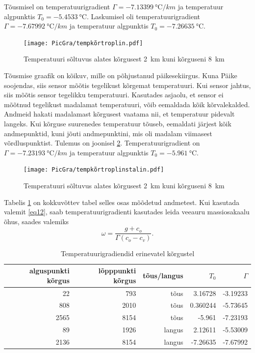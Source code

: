 \documentclass{trkut}%
\begin{document}
Tõusmisel on temperatuurigradient $\Gamma =\SI{-7.13399}{\degreeCelsius/km}$ ja temperatuur algpunktis $T_0 = \SI{-5.4533}{\celsius}$. Laskumisel oli temperatuurigradient $\Gamma =\SI{-7.67992}{\degreeCelsius/km}$ ja temperatuur algpunktis $T_0 = \SI{-7.26635}{\celsius}$.

\begin{figure}[h]
	\texttt{[image: PicGra/tempkõrtroplin.pdf]}
	\caption{Temperatuuri sõltuvus alates kõrgusest \SI{2}{km} kuni kõrguseni \SI{8}{km}}
	\label{tempkõrtroplin}%
\end{figure}

Tõusmise graafik on kõikuv, mille on põhjustanud päikesekiirgus. Kuna Päike soojendas, siis sensor mõõtis tegelikust kõrgemat temperatuuri. Kui sensor jahtus, siis mõõtis sensor tegelikku temperatuuri. Kasutades asjaolu, et sensor ei mõõtnud tegelikust madalamat temperatuuri, võib eemaldada kõik kõrvalekalded. Andmeid hakati madalamast kõrgusest vaatama nii, et temperatuur pidevalt langeks. Kui kõrguse suurenedes temperatuur tõuseb, eemaldati järjest kõik andmepunktid, kuni jõuti andmepunktini, mis oli madalam viimasest võrdluspunktist. Tulemus on joonisel \ref{tempkõrtroplinstalin}. Temperatuurigradient on $\Gamma =\SI{-7.23193}{\degreeCelsius/km}$ ja temperatuur algpunktis $T_0 = \SI{-5.961}{\celsius}$.

\begin{figure}[h]
	\texttt{[image: PicGra/tempkõrtroplinstalin.pdf]}
 	\caption{Temperatuuri sõltuvus alates kõrgusest \SI{2}{km} kuni kõrguseni \SI{8}{km}}
 	\label{tempkõrtroplinstalin}%
\end{figure}

Tabelis \ref{tabel1} on kokkuvõttev tabel selles osas mõõdetud andmetest. Kui kasutada valemit \ref{eq12}, saab temperatuurigradienti kasutades leida veeauru massiosakaalu õhus, saades valemiks
\begin{equation}
\omega = \frac{g + c_o}{\Gamma(c_o-c_v)}.
\end{equation}
\begin{table}[htb]
	\caption{Temperatuurigradiendid erinevatel kõrgustel}
	\label{tabel1}
	\begin{tabular}{r|r|r|r|r}
		\hline
		alguspunkti kõrgus & lõpppunkti kõrgus & tõus/langus & $T_0$ & $\Gamma$ \\
		\hline
		22 & 793 & tõus & 3.16728 & -3.19233 \\
		808 & 2010 & tõus & 0.360244 & -5.73645 \\
		2565 & 8154 & tõus & -5.961 & -7.23193 \\
		89 & 1926 & langus & 2.12611 & -5.53009 \\
		2136 & 8154 & langus & -7.26635 & -7.67992
	\end{tabular}
\end{table}
\end{document}
